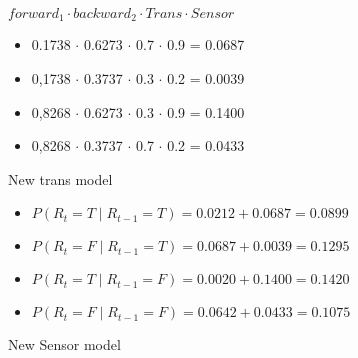 \documentclass[colorlinks=true,linkcolor=blue]{article}
\begin{document}
$forward_1 \cdot backward_2 \cdot Trans \cdot Sensor$
\begin{itemize}
\item 0.1738 $\cdot$ 0.6273 $\cdot$ 0.7 $\cdot$ 0.9 = 0.0687
\item 0,1738 $\cdot$ 0.3737 $\cdot$ 0.3 $\cdot$ 0.2 = 0.0039
\item 0,8268 $\cdot$ 0.6273 $\cdot$ 0.3 $\cdot$ 0.9 = 0.1400
\item 0,8268 $\cdot$ 0.3737 $\cdot$ 0.7 $\cdot$ 0.2 = 0.0433
\end{itemize}

New trans model
\begin{itemize}
\item $P(R_t = T \mid R_{t-1} = T) = 0.0212 + 0.0687 = 0.0899$
\item $P(R_t = F \mid R_{t-1} = T) = 0.0687 + 0.0039 = 0.1295$
\item $P(R_t = T \mid R_{t-1} = F) = 0.0020 + 0.1400 = 0.1420$
\item $P(R_t = F \mid R_{t-1} = F) = 0.0642 + 0.0433 = 0.1075$
\end{itemize}

New Sensor model
\end{document}
